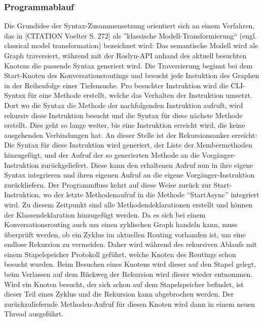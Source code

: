\subsubsection{Programmablauf}
\label{subsubsec:Programablauf}
Die Grundidee der Syntax-Zusammensetzung orientiert sich an einem Verfahren, das in [CITATION Voelter S. 272] als ''klassische Modell-Transformierung`` (engl. classical model transformation) bezeichnet wird: Das semantische Modell wird als Graph traversiert, während mit der Roslyn-API anhand des aktuell besuchten Knotens die passende Syntax generiert wird. Die Traversierung beginnt bei dem Start-Knoten des Konversationsroutings und besucht jede Instuktion des Graphen in der Reihenfolge einer Tiefensuche. Pro besuchter Instruktion wird die CLI-Syntax für eine Methode erstellt, welche das Verhalten der Instruktion umsetzt. Dort wo die Syntax die Methode der nachfolgenden Instruktion aufruft, wird rekursiv diese Instruktion besucht und die Syntax für diese nächste Methode erstellt. Dies geht so lange weiter, bis eine Instruktion erreicht wird, die keine ausgehenden Verbindungen hat. An dieser Stelle ist der Rekursionsanker erreicht: Die Syntax für diese Instruktion wird generiert, der Liste der Membermethoden hinzugefügt, und der Aufruf der so generierten Methode an die Vorgänger-Instruktion zurückgeliefert. Diese kann den erhaltenen Aufruf nun in ihre eigene Syntax integrieren und ihren eigenen Aufruf an die eigene Vorgänger-Instruktion zurückliefern. Der Programmfluss kehrt auf diese Weise zurück zur Start-Instruktion, wo der letzte Methodenaufruf in die Methode ``StartAsync'' integriert wird. Zu diesem Zeitpunkt sind alle Methodendeklarationen erstellt und können der Klassendeklaration hinzugefügt werden.
\newline
Da es sich bei einem Konversationsrouting auch um einen zyklischen Graph handeln kann, muss überprüft werden, ob ein Zyklus im aktuellen Routing vorhanden ist, um eine endlose Rekursion zu vermeiden. Daher wird während des rekursiven Ablaufs mit einem Stapelspeicher Protokoll geführt, welche Knoten des Routings schon besucht wurden. Beim Besuchen eines Knotens wird dieser auf den Stapel gelegt, beim Verlassen auf dem Rückweg der Rekursion wird dieser wieder entnommen. Wird ein Knoten besucht, der sich schon auf dem Stapelspeicher befindet, ist dieser Teil eines Zyklus und die Rekursion kann abgebrochen werden. Der zurückzuliefernde Methoden-Aufruf für diesen Knoten wird dann in einem neuen Thread ausgeführt. 
\newline
